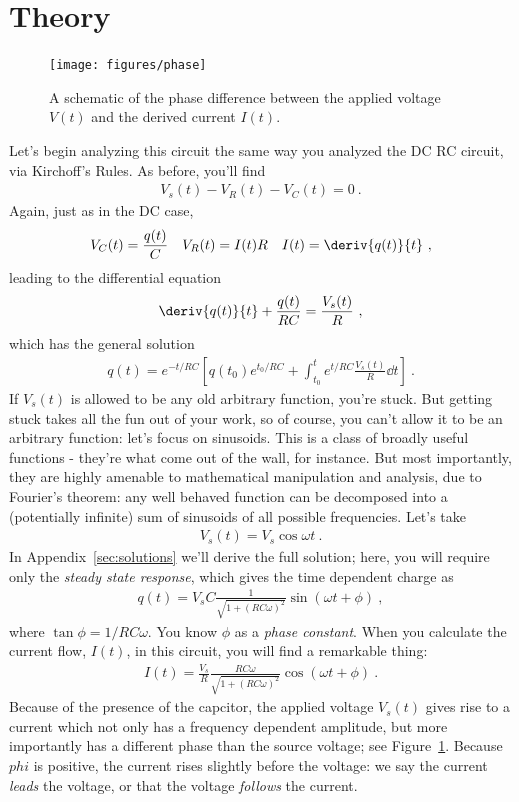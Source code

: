 \documentclass[12pt]{article}
\begin{document}
\section{Theory}
\label{sec:theory}

\begin{figure}
  \centering
  \texttt{[image: figures/phase]}
  \caption{A schematic of the phase difference between the applied
    voltage $V(t)$ and the derived current $I(t)$.}
  \label{fig:phase}
\end{figure}
Let's begin analyzing this circuit the same way you analyzed the DC RC
circuit, via Kirchoff's Rules.  As before, you'll find
\begin{gather*}
  V_s(t) - V_R(t) - V_C(t) = 0\ .
\end{gather*}
Again, just as in the DC case,
\begin{align*}
  V_C(t) &= \frac{q(t)}{C} & V_R(t) &= I(t) R & I(t) =
  \deriv{q(t)}{t}\ ,
\end{align*}
leading to the differential equation
\begin{gather*}
  \deriv{q(t)}{t} + \frac{q(t)}{RC} = \frac{V_s(t)}{R}\ ,
\end{gather*}
which has the general solution
\begin{gather*}
  q(t) = e^{-t/RC} \left[ 
    q(t_0) e^{t_0/RC} + \int_{t_0}^t e^{t/RC} \frac{V_s(t)}{R} \dd t
\right]\ .
\end{gather*}
If $V_s(t)$ is allowed to be any old arbitrary function, you're stuck.
But getting stuck takes all the fun out of your work, so of course,
you can't allow it to be an arbitrary function: let's focus on
sinusoids.  This is a class of broadly useful functions - they're what
come out of the wall, for instance.  But most importantly, they are
highly amenable to mathematical manipulation and analysis, due to
Fourier's theorem: any well behaved function can be decomposed into a
(potentially infinite) sum of sinusoids of all possible frequencies.
Let's take
\begin{gather*}
  V_s(t) = V_s \cos \omega t\ .
\end{gather*}
In Appendix~\ref{sec:solutions} we'll derive the full solution; here,
you will require only the \textit{steady state response}, which gives
the time dependent charge as
\begin{gather*}
  q(t) = V_s C \frac{1}{\sqrt{1+(RC\omega)^2}} \sin( \omega t + \phi)\ ,
\end{gather*}
where $\tan \phi = 1/RC\omega$.  You know $\phi$ as a \textit{phase
  constant}.  When you calculate the current flow, $I(t)$, in this
circuit, you will find a remarkable thing:
\begin{gather*}
  I(t) = \frac{V_s}{R} \frac{RC\omega}{\sqrt{1+(RC\omega)^2}} \cos(
  \omega t + \phi)\ .
\end{gather*}
Because of the presence of the capcitor, the applied voltage $V_s(t)$
gives rise to a current which not only has a frequency dependent
amplitude, but more importantly has a different phase than the source
voltage; see Figure~\ref{fig:phase}.  Because $phi$ is positive, the
current rises slightly before the voltage: we say the current
\textit{leads} the voltage, or that the voltage \textit{follows} the
current.
\end{document}
